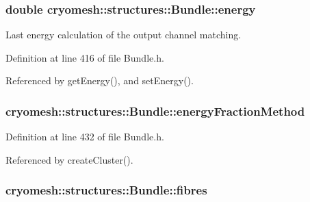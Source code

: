 \hypertarget{classcryomesh_1_1structures_1_1Bundle_aac5229c4c52e646767db2144ba745aa6}{
\subsubsection[{energy}]{\setlength{\rightskip}{0pt plus 5cm}double {\bf cryomesh\-::structures\-::\-Bundle\-::energy}}}\label{classcryomesh_1_1structures_1_1Bundle_aac5229c4c52e646767db2144ba745aa6}


\-Last energy calculation of the output channel matching. 



\-Definition at line 416 of file \-Bundle.\-h.



\-Referenced by get\-Energy(), and set\-Energy().

\hypertarget{classcryomesh_1_1structures_1_1Bundle_abbd8555380ffa4c33a235636837bafaa}{
\subsubsection[{energy\-Fraction\-Method}]{ {\bf cryomesh\-::structures\-::\-Bundle\-::energy\-Fraction\-Method}}}\label{classcryomesh_1_1structures_1_1Bundle_abbd8555380ffa4c33a235636837bafaa}


\-Definition at line 432 of file \-Bundle.\-h.



\-Referenced by create\-Cluster().

\hypertarget{classcryomesh_1_1structures_1_1Bundle_a71b3308a867169b8e9af9ab71b8bdf98}{
\subsubsection[{fibres}]{ {\bf cryomesh\-::structures\-::\-Bundle\-::fibres}}}\label{classcryomesh_1_1structures_1_1Bundle_a71b3308a867169b8e9af9ab71b8bdf98}


